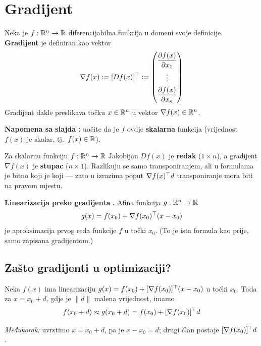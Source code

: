 \section{Gradijent}
\label{sec:gradijent}

\begin{definicija}[Gradijent]
Neka je $f : \mathbb{R}^n \to \mathbb{R}$ diferencijabilna funkcija u domeni svoje definicije.
\textbf{Gradijent} je definiran kao vektor
\[
\nabla f(x) := [Df(x)]^{\top} :=
\begin{pmatrix}
\dfrac{\partial f(x)}{\partial x_1} \\[8pt]
\vdots \\[4pt]
\dfrac{\partial f(x)}{\partial x_n}
\end{pmatrix}
\]
Gradijent dakle preslikava točku $x \in \mathbb{R}^n$ u vektor $\nabla f(x) \in \mathbb{R}^n$.
\end{definicija}

\textbf{Napomena sa slajda} \textbf{:} uočite da je $f$ ovdje
\textbf{skalarna} funkcija (vrijednost $f(x)$ je skalar, tj.\ $f(x) \in \mathbb{R}$).

\begin{napomena}
Za skalarnu funkciju $f : \mathbb{R}^n \to \mathbb{R}$ Jakobijan $Df(x)$ je \textbf{redak}
($1 \times n$), a gradijent $\nabla f(x)$ je \textbf{stupac} ($n \times 1$).
Razlikuju se samo transponiranjem, ali u formulama je bitno koji je koji ---
zato u izrazima poput $\nabla f(x)^{\top} d$ transponiranje mora biti na pravom
mjestu.
\end{napomena}

\textbf{Linearizacija preko gradijenta} \textbf{.} Afina funkcija
$g : \mathbb{R}^n \to \mathbb{R}$
\[
g(x) = f(x_0) + \nabla f(x_0)^{\top} (x - x_0)
\]
je aproksimacija prvog reda funkcije $f$ u točki $x_0$. (To je ista formula kao
prije, samo zapisana gradijentom.)

\subsection{Zašto gradijenti u optimizaciji?}

Neka $f(x)$ ima linearizaciju $g(x) = f(x_0) + [\nabla f(x_0)]^{\top}(x - x_0)$ u
točki $x_0$. Tada za $x = x_0 + d$, gdje je $\|d\|$ malena vrijednost, imamo
\[
f(x_0 + d) \approx g(x_0 + d) = f(x_0) + [\nabla f(x_0)]^{\top} d
\]

\emph{Međukorak:} uvrstimo $x = x_0 + d$, pa je $x - x_0 = d$; drugi član
postaje $[\nabla f(x_0)]^{\top} d$.

